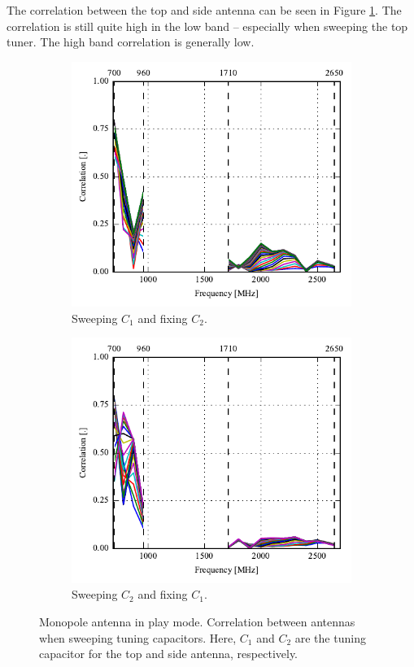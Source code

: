 The correlation between the top and side antenna can be seen in Figure \ref{fig:corr_mono_modi_play_mode}. The correlation is still quite high in the low band -- especially when sweeping the top tuner. The high band correlation is generally low.
\begin{figure}[htbp]
    \centering
    \begin{subfigure}{0.49\linewidth}
        \includegraphics{img/tech_sol/monopole/highband/ue/playmode/corr_top.pdf}
        \caption{Sweeping $C_1$ and fixing $C_2$.}
    \end{subfigure}
    \hfill
    \begin{subfigure}{0.49\linewidth}
        \includegraphics{img/tech_sol/monopole/highband/ue/playmode/corr_side.pdf}
        \caption{Sweeping $C_2$ and fixing $C_1$.}
    \end{subfigure}
    \caption{Monopole antenna in play mode. Correlation between antennas when sweeping tuning capacitors. Here, $C_1$ and $C_2$ are the tuning capacitor for the top and side antenna, respectively.}
    \label{fig:corr_mono_modi_play_mode}
\end{figure}

